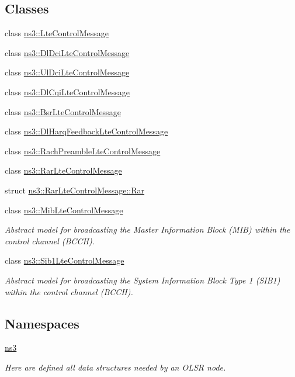 \subsection*{Classes}
\begin{DoxyCompactItemize}
\item 
class \hyperlink{classns3_1_1LteControlMessage}{ns3\+::\+Lte\+Control\+Message}
\item 
class \hyperlink{classns3_1_1DlDciLteControlMessage}{ns3\+::\+Dl\+Dci\+Lte\+Control\+Message}
\item 
class \hyperlink{classns3_1_1UlDciLteControlMessage}{ns3\+::\+Ul\+Dci\+Lte\+Control\+Message}
\item 
class \hyperlink{classns3_1_1DlCqiLteControlMessage}{ns3\+::\+Dl\+Cqi\+Lte\+Control\+Message}
\item 
class \hyperlink{classns3_1_1BsrLteControlMessage}{ns3\+::\+Bsr\+Lte\+Control\+Message}
\item 
class \hyperlink{classns3_1_1DlHarqFeedbackLteControlMessage}{ns3\+::\+Dl\+Harq\+Feedback\+Lte\+Control\+Message}
\item 
class \hyperlink{classns3_1_1RachPreambleLteControlMessage}{ns3\+::\+Rach\+Preamble\+Lte\+Control\+Message}
\item 
class \hyperlink{classns3_1_1RarLteControlMessage}{ns3\+::\+Rar\+Lte\+Control\+Message}
\item 
struct \hyperlink{structns3_1_1RarLteControlMessage_1_1Rar}{ns3\+::\+Rar\+Lte\+Control\+Message\+::\+Rar}
\item 
class \hyperlink{classns3_1_1MibLteControlMessage}{ns3\+::\+Mib\+Lte\+Control\+Message}
\begin{DoxyCompactList}\small\item\em Abstract model for broadcasting the Master Information Block (M\+IB) within the control channel (B\+C\+CH). \end{DoxyCompactList}\item 
class \hyperlink{classns3_1_1Sib1LteControlMessage}{ns3\+::\+Sib1\+Lte\+Control\+Message}
\begin{DoxyCompactList}\small\item\em Abstract model for broadcasting the System Information Block Type 1 (S\+I\+B1) within the control channel (B\+C\+CH). \end{DoxyCompactList}\end{DoxyCompactItemize}
\subsection*{Namespaces}
\begin{DoxyCompactItemize}
\item 
 \hyperlink{namespacens3}{ns3}
\begin{DoxyCompactList}\small\item\em Here are defined all data structures needed by an O\+L\+SR node. \end{DoxyCompactList}\end{DoxyCompactItemize}
